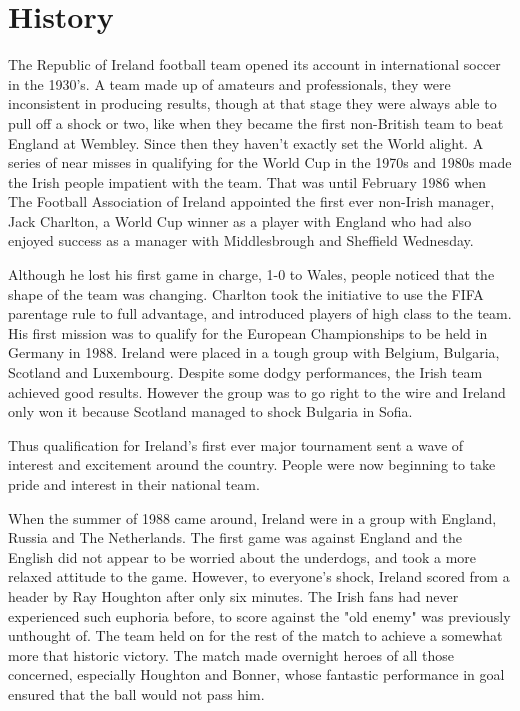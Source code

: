\section{History}
The Republic of Ireland football team opened its account in international 
soccer in the 1930's. A team made up of amateurs and professionals, they were 
inconsistent in producing results, though at that stage they were always able 
to pull off a shock or two, like when they became the first non-British team to
beat England at Wembley. Since then they haven't exactly set the World alight.
A series of near misses in qualifying for the World Cup in the 1970s and 
1980s made the Irish people impatient with the team. That was until February 
1986 when The Football Association of Ireland appointed the first ever 
non-Irish manager, Jack Charlton, a World Cup winner as a player with England 
who had also enjoyed success as a manager with Middlesbrough and Sheffield 
Wednesday.

Although he lost his first game in charge, 1-0 to Wales, people noticed that 
the shape of the team was changing. Charlton took the initiative to use the 
FIFA parentage rule to full advantage, and introduced players of high class to 
the team. His first mission was to qualify for the European Championships to be
held in Germany in 1988. Ireland were placed in a tough group with Belgium, 
Bulgaria, Scotland and Luxembourg. Despite some dodgy performances, the Irish 
team achieved good results. However the group was to go right to the wire and 
Ireland only won it because Scotland managed to shock Bulgaria in Sofia.

Thus qualification for Ireland's first ever major tournament sent a wave of 
interest and excitement around the country. People were now beginning to take 
pride and interest in their national team.  

When the summer of 1988 came around, Ireland were in a group with England, 
Russia and The Netherlands. The first game was against England and the English
did not appear to be worried about the underdogs, and took a more relaxed 
attitude to the game. However, to everyone's shock, Ireland scored from a 
header by Ray Houghton after only six minutes. The Irish fans had never 
experienced such euphoria before, to score against the "old enemy" was 
previously unthought of. The team held on for the rest of the match to achieve
a somewhat more that historic victory. The match made overnight heroes of all
those concerned, especially Houghton and Bonner, whose fantastic performance in
goal ensured that the ball would not pass him.

